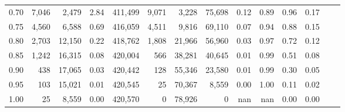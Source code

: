 \begin{tabular}{rrrrrrrrrrrrrr}
0.70 &   7,046 &   2,479 &     2.84 &  411,499 &    9,071 &   3,228 &  75,698 &  0.12 &  0.89 &  0.96 &      0.17 \\
0.75 &   4,560 &   6,588 &     0.69 &  416,059 &    4,511 &   9,816 &  69,110 &  0.07 &  0.94 &  0.88 &      0.15 \\
0.80 &   2,703 &  12,150 &     0.22 &  418,762 &    1,808 &  21,966 &  56,960 &  0.03 &  0.97 &  0.72 &      0.12 \\
0.85 &   1,242 &  16,315 &     0.08 &  420,004 &      566 &  38,281 &  40,645 &  0.01 &  0.99 &  0.51 &      0.08 \\
0.90 &     438 &  17,065 &     0.03 &  420,442 &      128 &  55,346 &  23,580 &  0.01 &  0.99 &  0.30 &      0.05 \\
0.95 &     103 &  15,021 &     0.01 &  420,545 &       25 &  70,367 &   8,559 &  0.00 &  1.00 &  0.11 &      0.02 \\
1.00 &      25 &   8,559 &     0.00 &  420,570 &        0 &  78,926 &       0 &   nan &   nan &  0.00 &      0.00 \\
\bottomrule
\end{tabular}
